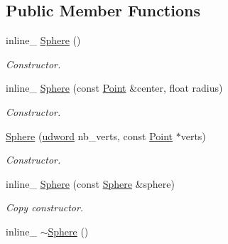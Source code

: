 \subsection*{Public Member Functions}
\begin{DoxyCompactItemize}
\item 
inline\+\_\+ \hyperlink{classOpcode_1_1Sphere_a09ee8485e15c0dd95749695ba38dc38e}{Sphere} ()\hypertarget{classOpcode_1_1Sphere_a09ee8485e15c0dd95749695ba38dc38e}{}\label{classOpcode_1_1Sphere_a09ee8485e15c0dd95749695ba38dc38e}

\begin{DoxyCompactList}\small\item\em Constructor. \end{DoxyCompactList}\item 
inline\+\_\+ \hyperlink{classOpcode_1_1Sphere_a097bda2edd5b16677aa9e23c098ae06a}{Sphere} (const \hyperlink{classOpcode_1_1Point}{Point} \&center, float radius)\hypertarget{classOpcode_1_1Sphere_a097bda2edd5b16677aa9e23c098ae06a}{}\label{classOpcode_1_1Sphere_a097bda2edd5b16677aa9e23c098ae06a}

\begin{DoxyCompactList}\small\item\em Constructor. \end{DoxyCompactList}\item 
\hyperlink{classOpcode_1_1Sphere_a55f256f0c4a87d45083dc0f65e9b148b}{Sphere} (\hyperlink{IceTypes_8h_a44c6f1920ba5551225fb534f9d1a1733}{udword} nb\+\_\+verts, const \hyperlink{classOpcode_1_1Point}{Point} $\ast$verts)\hypertarget{classOpcode_1_1Sphere_a55f256f0c4a87d45083dc0f65e9b148b}{}\label{classOpcode_1_1Sphere_a55f256f0c4a87d45083dc0f65e9b148b}

\begin{DoxyCompactList}\small\item\em Constructor. \end{DoxyCompactList}\item 
inline\+\_\+ \hyperlink{classOpcode_1_1Sphere_a6289b8c7fb937f8ead2384e1a90b0717}{Sphere} (const \hyperlink{classOpcode_1_1Sphere}{Sphere} \&sphere)\hypertarget{classOpcode_1_1Sphere_a6289b8c7fb937f8ead2384e1a90b0717}{}\label{classOpcode_1_1Sphere_a6289b8c7fb937f8ead2384e1a90b0717}

\begin{DoxyCompactList}\small\item\em Copy constructor. \end{DoxyCompactList}\item 
inline\+\_\+ \hyperlink{classOpcode_1_1Sphere_ad4f936b317bf0a7d87fbafa3b00f6fb9}{$\sim$\+Sphere} ()\hypertarget{classOpcode_1_1Sphere_ad4f936b317bf0a7d87fbafa3b00f6fb9}{}\label{classOpcode_1_1Sphere_ad4f936b317bf0a7d87fbafa3b00f6fb9}


\end{DoxyCompactItemize}
